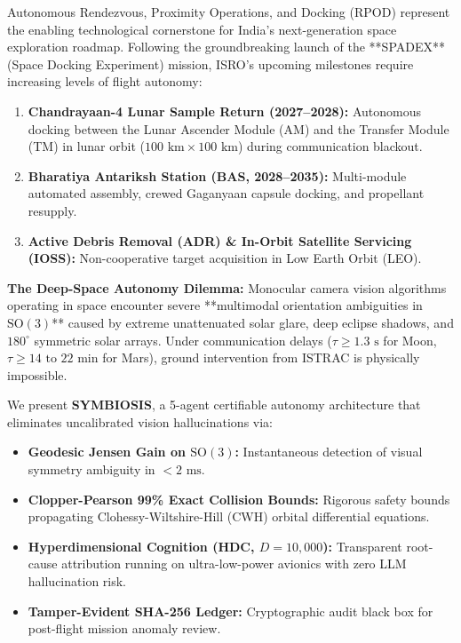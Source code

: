 \documentclass[11pt,a4paper]{article}
\begin{document}
Autonomous Rendezvous, Proximity Operations, and Docking (RPOD) represent the enabling technological cornerstone for India’s next-generation space exploration roadmap. Following the groundbreaking launch of the **SPADEX** (Space Docking Experiment) mission, ISRO's upcoming milestones require increasing levels of flight autonomy:
\begin{enumerate}[itemsep=1pt]
    \item \textbf{Chandrayaan-4 Lunar Sample Return (2027--2028):} Autonomous docking between the Lunar Ascender Module (AM) and the Transfer Module (TM) in lunar orbit ($100\text{ km} \times 100\text{ km}$) during communication blackout.
    \item \textbf{Bharatiya Antariksh Station (BAS, 2028--2035):} Multi-module automated assembly, crewed Gaganyaan capsule docking, and propellant resupply.
    \item \textbf{Active Debris Removal (ADR) \& In-Orbit Satellite Servicing (IOSS):} Non-cooperative target acquisition in Low Earth Orbit (LEO).
\end{enumerate}

\noindent
\textbf{The Deep-Space Autonomy Dilemma:} Monocular camera vision algorithms operating in space encounter severe **multimodal orientation ambiguities in $\mathrm{SO}(3)$** caused by extreme unattenuated solar glare, deep eclipse shadows, and $180^\circ$ symmetric solar arrays. Under communication delays ($\tau \ge 1.3\text{ s}$ for Moon, $\tau \ge 14\text{ to } 22\text{ min}$ for Mars), ground intervention from ISTRAC is physically impossible. 

We present \textbf{SYMBIOSIS}, a 5-agent certifiable autonomy architecture that eliminates uncalibrated vision hallucinations via:
\begin{itemize}[itemsep=1pt]
    \item \textbf{Geodesic Jensen Gain on $\mathrm{SO}(3)$:} Instantaneous detection of visual symmetry ambiguity in $< 2\text{ ms}$.
    \item \textbf{Clopper-Pearson 99\% Exact Collision Bounds:} Rigorous safety bounds propagating Clohessy-Wiltshire-Hill (CWH) orbital differential equations.
    \item \textbf{Hyperdimensional Cognition (HDC, $D=10,000$):} Transparent root-cause attribution running on ultra-low-power avionics with zero LLM hallucination risk.
    \item \textbf{Tamper-Evident SHA-256 Ledger:} Cryptographic audit black box for post-flight mission anomaly review.
\end{itemize}
\end{document}
